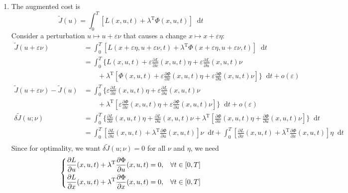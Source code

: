 \documentclass[letterpaper,11pt,titlepage]{article}
\newcommand*\dif{\mathop{}\!\mathrm{d}}
\newcommand{\trans}{^\text{T}}
\newcommand*\pder[2]{\frac{\partial #1}{\partial #2}}
\begin{document}
\begin{enumerate}[leftmargin=0pt]
\item The augmented cost is
  \[
    \tilde J(u) = \int_0^T\! \left[ L(x,u,t) + \lambda\trans \Phi(x,u,t) \right] \dif t
  \]
  Consider a perturbation $u\mapsto u+\varepsilon\nu$ that causes a change $x\mapsto x+\varepsilon\eta$:
  \begin{align}
    \tilde J(u+\varepsilon\nu) &= \int_0^T\! \left[ L(x+\varepsilon\eta,u+\varepsilon\nu,t) + \lambda\trans \Phi(x+\varepsilon\eta,u+\varepsilon\nu,t) \right] \dif t \\
                               &= \int_0^T\! \bigg\{ L(x,u,t) + \varepsilon\pder{L}{x}(x,u,t)\eta + \varepsilon\pder{L}{u}(x,u,t)\nu \\
                               & \qquad + \lambda\trans \left[ \Phi(x,u,t) + \varepsilon\pder{\Phi}{x}(x,u,t)\eta + \varepsilon\pder{\Phi}{u}(x,u,t)\nu \right] \bigg\} \dif t + o(\varepsilon) \\
    \tilde J(u+\varepsilon\nu) - \tilde J(u) &= \int_0^T\! \bigg\{ \varepsilon\pder{L}{x}(x,u,t)\eta + \varepsilon\pder{L}{u}(x,u,t)\nu \\
                               & \qquad + \lambda\trans \left[ \varepsilon\pder{\Phi}{x}(x,u,t)\eta + \varepsilon\pder{\Phi}{u}(x,u,t)\nu \right] \bigg\} \dif t + o(\varepsilon) \\
    \delta \tilde J(u;\nu) &= \int_0^T\! \bigg\{ \pder{L}{x}(x,u,t)\eta + \pder{L}{u}(x,u,t)\nu + \lambda\trans \left[ \pder{\Phi}{x}(x,u,t)\eta + \pder{\Phi}{u}(x,u,t)\nu \right] \bigg\} \dif t \\
                               &= \int_0^T\! \left[ \pder{L}{u}(x,u,t) + \lambda\trans \pder{\Phi}{u}(x,u,t) \right] \nu\dif t + \int_0^T\! \left[ \pder{L}{x}(x,u,t) + \lambda\trans \pder{\Phi}{x}(x,u,t) \right] \eta\dif t \\[-7ex]
  \end{align}
  Since for optimality, we want $\delta\tilde J(u;\nu)=0$ for all $\nu$ and $\eta$, we need
  \[
    \begin{dcases}
      \pder{L}{u}(x,u,t) + \lambda\trans \pder{\Phi}{u}(x,u,t) = 0, & \forall t\in[0,T] \\
      \pder{L}{x}(x,u,t) + \lambda\trans \pder{\Phi}{x}(x,u,t) = 0, & \forall t\in[0,T]
    \end{dcases}
  \]

\end{enumerate}
\end{document}
